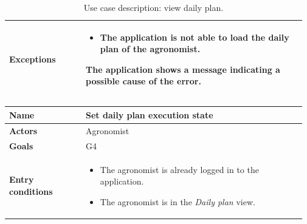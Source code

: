 \begin{table}[H]
\begin{tabular}{@{}p{0.25\linewidth} p{0.72\linewidth}@{}}
		\textbf{Exceptions}         & 
	    \begin{itemize}[leftmargin=.4cm,noitemsep,topsep=0pt,before=\vspace{-3mm}]
		   \item The application is not able to load the daily plan of the agronomist.
		\end{itemize}
		The application shows a message indicating a possible cause of the error.
		\\\bottomrule
	\end{tabular}
	\caption{Use case description: view daily plan.} 
\end{table}

\begin{table}[H]
    \centering
	\begin{tabular}{@{}p{0.25\linewidth} p{0.72\linewidth}@{}}
		\toprule
		\textbf{Name}               & Set daily plan execution state \\
		\midrule
		\textbf{Actors}             & Agronomist\\
		\midrule
		\textbf{Goals}              & G4 \\
		\midrule
		
		\textbf{Entry conditions}   & \begin{itemize}[leftmargin=.4cm,noitemsep,topsep=0pt,before=\vspace{-3mm},after=\vspace{-4mm}]
		    \item The agronomist is already logged in to the application.
		    \item The agronomist is in the \textit{Daily plan} view.
		\end{itemize}\\
		\midrule
		

\end{tabular}
\end{table}
